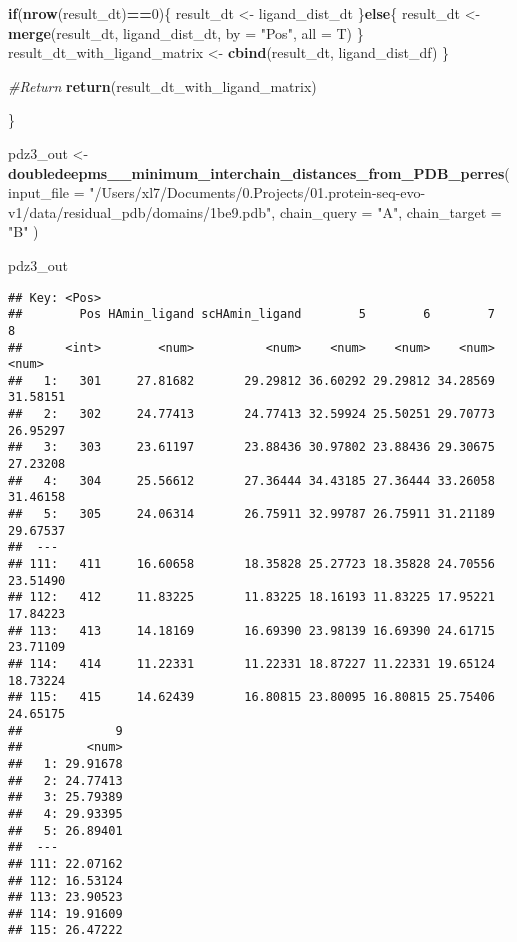 \documentclass[
]{article}
\newenvironment{Shaded}{\begin{snugshade}}{\end{snugshade}}
\newcommand{\AttributeTok}[1]{\textcolor[rgb]{0.13,0.29,0.53}{#1}}
\newcommand{\CommentTok}[1]{\textcolor[rgb]{0.56,0.35,0.01}{\textit{#1}}}
\newcommand{\ControlFlowTok}[1]{\textcolor[rgb]{0.13,0.29,0.53}{\textbf{#1}}}
\newcommand{\DecValTok}[1]{\textcolor[rgb]{0.00,0.00,0.81}{#1}}
\newcommand{\FunctionTok}[1]{\textcolor[rgb]{0.13,0.29,0.53}{\textbf{#1}}}
\newcommand{\NormalTok}[1]{#1}
\newcommand{\OtherTok}[1]{\textcolor[rgb]{0.56,0.35,0.01}{#1}}
\newcommand{\SpecialCharTok}[1]{\textcolor[rgb]{0.81,0.36,0.00}{\textbf{#1}}}
\newcommand{\StringTok}[1]{\textcolor[rgb]{0.31,0.60,0.02}{#1}}
\begin{document}
\begin{Shaded}
\begin{Highlighting}[]
      \ControlFlowTok{if}\NormalTok{(}\FunctionTok{nrow}\NormalTok{(result\_dt)}\SpecialCharTok{==}\DecValTok{0}\NormalTok{)\{}
\NormalTok{        result\_dt }\OtherTok{\textless{}{-}}\NormalTok{ ligand\_dist\_dt}
\NormalTok{      \}}\ControlFlowTok{else}\NormalTok{\{}
\NormalTok{        result\_dt }\OtherTok{\textless{}{-}} \FunctionTok{merge}\NormalTok{(result\_dt, ligand\_dist\_dt, }\AttributeTok{by =} \StringTok{"Pos"}\NormalTok{, }\AttributeTok{all =}\NormalTok{ T)}
\NormalTok{      \}}
\NormalTok{     result\_dt\_with\_ligand\_matrix }\OtherTok{\textless{}{-}} \FunctionTok{cbind}\NormalTok{(result\_dt, ligand\_dist\_df)}
\NormalTok{  \}}

  \CommentTok{\#Return}
    \FunctionTok{return}\NormalTok{(result\_dt\_with\_ligand\_matrix)}

\NormalTok{\}}

\NormalTok{pdz3\_out }\OtherTok{\textless{}{-}} \FunctionTok{doubledeepms\_\_minimum\_interchain\_distances\_from\_PDB\_perres}\NormalTok{(}
  \AttributeTok{input\_file =} \StringTok{"/Users/xl7/Documents/0.Projects/01.protein{-}seq{-}evo{-}v1/data/residual\_pdb/domains/1be9.pdb"}\NormalTok{,}
  \AttributeTok{chain\_query =} \StringTok{"A"}\NormalTok{,}
  \AttributeTok{chain\_target =} \StringTok{"B"}
\NormalTok{)}

\NormalTok{pdz3\_out}
\end{Highlighting}
\end{Shaded}

\begin{verbatim}
## Key: <Pos>
##        Pos HAmin_ligand scHAmin_ligand        5        6        7        8
##      <int>        <num>          <num>    <num>    <num>    <num>    <num>
##   1:   301     27.81682       29.29812 36.60292 29.29812 34.28569 31.58151
##   2:   302     24.77413       24.77413 32.59924 25.50251 29.70773 26.95297
##   3:   303     23.61197       23.88436 30.97802 23.88436 29.30675 27.23208
##   4:   304     25.56612       27.36444 34.43185 27.36444 33.26058 31.46158
##   5:   305     24.06314       26.75911 32.99787 26.75911 31.21189 29.67537
##  ---                                                                      
## 111:   411     16.60658       18.35828 25.27723 18.35828 24.70556 23.51490
## 112:   412     11.83225       11.83225 18.16193 11.83225 17.95221 17.84223
## 113:   413     14.18169       16.69390 23.98139 16.69390 24.61715 23.71109
## 114:   414     11.22331       11.22331 18.87227 11.22331 19.65124 18.73224
## 115:   415     14.62439       16.80815 23.80095 16.80815 25.75406 24.65175
##             9
##         <num>
##   1: 29.91678
##   2: 24.77413
##   3: 25.79389
##   4: 29.93395
##   5: 26.89401
##  ---         
## 111: 22.07162
## 112: 16.53124
## 113: 23.90523
## 114: 19.91609
## 115: 26.47222
\end{verbatim}
\end{document}
